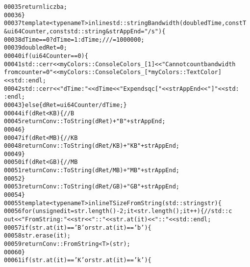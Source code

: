\begin{footnotesize}
\begin{alltt}
00035         \textcolor{keywordflow}{return} liczba;
00036         \}
00037         \textcolor{keyword}{template} <\textcolor{keyword}{typename} T> \textcolor{keyword}{inline} std::string Bandwidth(\textcolor{keywordtype}{double} dTime ,\textcolor{keyword}{const} T 
      &ui64Counter,\textcolor{keyword}{const} std::string &strAppEnd = \textcolor{stringliteral}{"/s"})\{
00038             dTime == 0 ? dTime = 1 : dTime;\textcolor{comment}{// /= 1000000;}
00039             \textcolor{keywordtype}{double} dRet = 0;
00040             \textcolor{keywordflow}{if} ( ui64Counter == 0)\{
00041                 std::cerr<<myColors::ConsoleColors\_[1]<<\textcolor{stringliteral}{"Can not count bandwidth 
      from counter = 0"}<<myColors::ConsoleColors\_[*myColors::TextColor]<<std::endl;
00042                 std::cerr<<\textcolor{stringliteral}{"dTime:"}<<dTime<<\textcolor{stringliteral}{" Exp end sqc["}<<strAppEnd<<\textcolor{stringliteral}{"]"}<<std:
      :endl;
00043             \}\textcolor{keywordflow}{else}\{ dRet = ui64Counter / dTime ;\}
00044             \textcolor{keywordflow}{if} (dRet < KB )\{ \textcolor{comment}{//B}
00045                 \textcolor{keywordflow}{return} Conv::ToString(dRet)+\textcolor{stringliteral}{"B"}+strAppEnd;
00046             \}
00047             \textcolor{keywordflow}{if} ( dRet < MB )\{\textcolor{comment}{//KB}
00048                 \textcolor{keywordflow}{return} Conv::ToString(dRet/KB)+\textcolor{stringliteral}{"KB"}+strAppEnd;
00049             \}
00050             \textcolor{keywordflow}{if}( dRet < GB )\{\textcolor{comment}{//MB}
00051                 \textcolor{keywordflow}{return} Conv::ToString(dRet/MB)+\textcolor{stringliteral}{"MB"}+strAppEnd;
00052             \}
00053             \textcolor{keywordflow}{return} Conv::ToString(dRet/GB)+\textcolor{stringliteral}{"GB"}+strAppEnd;
00054         \}
00055         \textcolor{keyword}{template} <\textcolor{keyword}{typename} T> \textcolor{keyword}{inline} T SizeFromString(std::string str)\{
00056             \textcolor{keywordflow}{for} (\textcolor{keywordtype}{unsigned} it = str.length()-2; it < str.length(); it++)\{ \textcolor{comment}{//std::c
      out<<"FromString: "<<str<<"::"<<str.at(it)<<"::"<<std::endl;}
00057                 \textcolor{keywordflow}{if}(str.at(it) == \textcolor{charliteral}{'B'} or str.at(it) == \textcolor{charliteral}{'b'})\{
00058                     str.erase(it);
00059                     \textcolor{keywordflow}{return} Conv::FromString<T>(str);
00060                 \}
00061                 \textcolor{keywordflow}{if}(str.at(it) == \textcolor{charliteral}{'K'} or str.at(it) == \textcolor{charliteral}{'k'})\{

\end{alltt}
\end{footnotesize}
